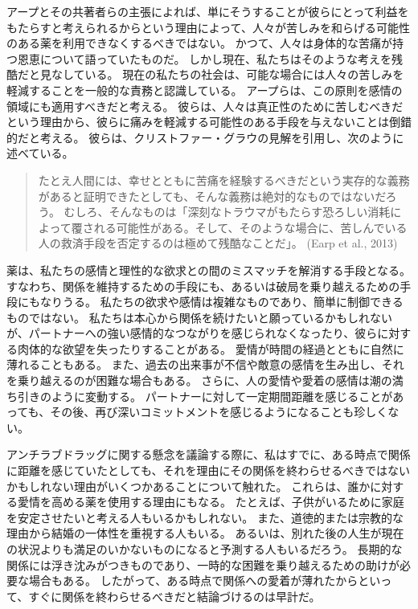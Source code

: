 \documentclass[paper=a4,book,openany]{jlreq}
\newcommand{\ig}[1]{}           %
\begin{document}
アープとその共著者らの主張によれば、単にそうすることが彼らにとって利益をもたらすと考えられるからという理由によって、人々が苦しみを和らげる可能性のある薬を利用できなくするべきではない。
かつて、人々は身体的な苦痛が持つ恩恵について語っていたものだ。
しかし現在、私たちはそのような考えを残酷だと見なしている。
現在の私たちの社会は、可能な場合には人々の苦しみを軽減することを一般的な責務と認識している。
アープらは、この原則を感情の領域にも適用すべきだと考える。
彼らは、人々は真正性のために苦しむべきだという理由から、彼らに痛みを軽減する可能性のある手段を与えないことは倒錯的だと考える。
彼らは、クリストファー・グラウ\ig{(Christopher Grau)}の見解\citep{grau06:_etern_sunsh_spotl_mind_moral_memor}を引用し、次のように述べている。

\begin{quote}
たとえ人間には、幸せとともに苦痛を経験するべきだという実存的な義務があると証明できたとしても、そんな義務は絶対的なものではないだろう。
むしろ、そんなものは「深刻なトラウマがもたらす恐ろしい消耗によって覆される可能性がある。そして、そのような場合に、苦しんでいる人の救済手段を否定するのは極めて残酷なことだ」。
(Earp et al., 2013\ig{, p.13. \citet{grau06:_etern_sunsh_spotl_mind_moral_memor}を引用している})
  \nocite{earp13:_if_i_could_just_stop_lovin_you}

\end{quote}

薬は、私たちの感情と理性的な欲求との間のミスマッチを解消する手段となる。すなわち、関係を維持するための手段にも、あるいは破局を乗り越えるための手段にもなりうる。
私たちの欲求や感情は複雑なものであり、簡単に制御できるものではない。
私たちは本心から関係を続けたいと願っているかもしれないが、パートナーへの強い感情的なつながりを感じられなくなったり、彼らに対する肉体的な欲望を失ったりすることがある。
愛情が時間の経過とともに自然に薄れることもある。
また、過去の出来事が不信や敵意の感情を生み出し、それを乗り越えるのが困難な場合もある。
さらに、人の愛情や愛着の感情は潮の満ち引きのように変動する。
パートナーに対して一定期間距離を感じることがあっても、その後、再び深いコミットメントを感じるようになることも珍しくない。

アンチラブドラッグに関する懸念を議論する際に、私はすでに、ある時点で関係に距離を感じていたとしても、それを理由にその関係を終わらせるべきではないかもしれない理由がいくつかあることについて触れた。
これらは、誰かに対する愛情を高める薬を使用する理由にもなる。
たとえば、子供がいるために家庭を安定させたいと考える人もいるかもしれない。
また、道徳的または宗教的な理由から結婚の一体性を重視する人もいる。
あるいは、別れた後の人生が現在の状況よりも満足のいかないものになると予測する人もいるだろう。
長期的な関係には浮き沈みがつきものであり、一時的な困難を乗り越えるための助けが必要な場合もある。
したがって、ある時点で関係への愛着が薄れたからといって、すぐに関係を終わらせるべきだと結論づけるのは早計だ。
\end{document}
